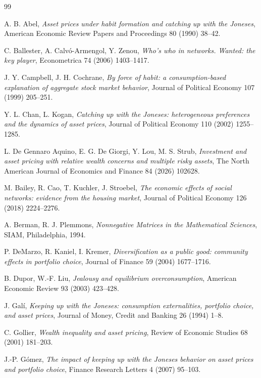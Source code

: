\documentclass[12pt]{article}
\theoremstyle{definition}
\theoremstyle{remark}
\begin{document}
\begin{thebibliography}{99}

 A. B. Abel,
\emph{Asset prices under habit formation and catching up with the Joneses},
American Economic Review Papers and Proceedings 80 (1990) 38--42.

 C. Ballester, A. Calv\'o-Armengol, Y. Zenou,
\emph{Who's who in networks. Wanted: the key player},
Econometrica 74 (2006) 1403--1417.

 J. Y. Campbell, J. H. Cochrane,
\emph{By force of habit: a consumption-based explanation of aggregate stock
market behavior}, Journal of Political Economy 107 (1999) 205--251.

 Y. L. Chan, L. Kogan,
\emph{Catching up with the Joneses: heterogeneous preferences and the dynamics
of asset prices}, Journal of Political Economy 110 (2002) 1255--1285.

 L. De Gennaro Aquino, E. G. De Giorgi, Y. Lou, M. S. Strub,
\emph{Investment and asset pricing with relative wealth concerns and multiple
risky assets},
The North American Journal of Economics and Finance 84 (2026) 102628.

 M. Bailey, R. Cao, T. Kuchler, J. Stroebel,
\emph{The economic effects of social networks: evidence from the housing
market}, Journal of Political Economy 126 (2018) 2224--2276.

 A. Berman, R. J. Plemmons,
\emph{Nonnegative Matrices in the Mathematical Sciences},
SIAM, Philadelphia, 1994.

 P. DeMarzo, R. Kaniel, I. Kremer,
\emph{Diversification as a public good: community effects in portfolio choice},
Journal of Finance 59 (2004) 1677--1716.

 B. Dupor, W.-F. Liu,
\emph{Jealousy and equilibrium overconsumption},
American Economic Review 93 (2003) 423--428.

 J. Gal\'i,
\emph{Keeping up with the Joneses: consumption externalities, portfolio choice,
and asset prices},
Journal of Money, Credit and Banking 26 (1994) 1--8.

 C. Gollier,
\emph{Wealth inequality and asset pricing},
Review of Economic Studies 68 (2001) 181--203.

 J.-P. G\'omez,
\emph{The impact of keeping up with the Joneses behavior on asset prices and
portfolio choice},
Finance Research Letters 4 (2007) 95--103.


\end{thebibliography}
\end{document}
